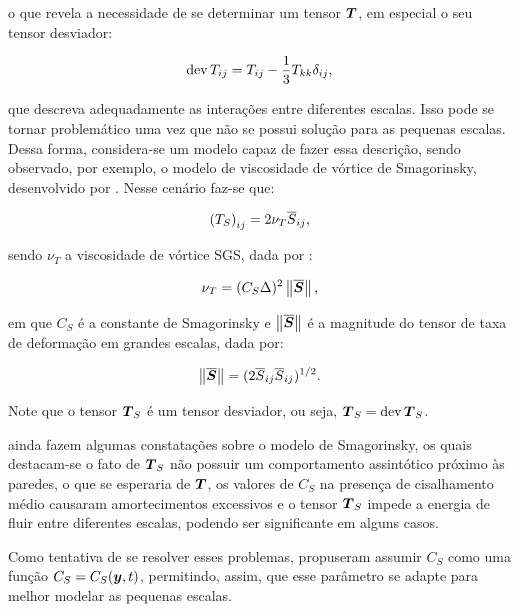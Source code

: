 \noindent o que revela a necessidade de se determinar um tensor $\boldsymbol{T}$, em especial o seu tensor desviador:

\begin{equation}
    \mathop{\mathrm{dev}}\nolimits{T_{ij}}=T_{ij}-\frac{1}{3}T_{kk}\delta_{ij}\text{,}
\end{equation}

\noindent que descreva adequadamente as interações entre diferentes escalas. Isso pode se tornar problemático uma vez que não se possui solução para as pequenas escalas. Dessa forma, considera-se um modelo capaz de fazer essa descrição, sendo observado, por exemplo, o modelo de viscosidade de vórtice de Smagorinsky, desenvolvido por . Nesse cenário faz-se que:

\begin{equation}
    \left({T_S}\right)_{ij}=2\nu_T\overline{S}_{ij}\text{,}
\end{equation}

\noindent sendo $\nu_T$ a viscosidade de vórtice SGS, dada por \cite{germano1991dynamic,piomelli1999large,hughes2000large,bailly2015turbulence,katopodes2019free}:

\begin{equation}
    \nu_T=(C_S\Delta)^2\left\lVert{\overline{\boldsymbol{S}}}\right\lVert\text{,}
\end{equation}

\noindent em que $C_S$ é a constante de Smagorinsky e $\left\lVert{\overline{\boldsymbol{S}}}\right\lVert$ é a magnitude do tensor de taxa de deformação em grandes escalas, dada por:

\begin{equation}
    \left\lVert{\overline{\boldsymbol{S}}}\right\lVert=(2\overline{S}_{ij}\overline{S}_{ij})^{1/2}\text{.}
\end{equation}

Note que o tensor $\boldsymbol{T}_S$ é um tensor desviador, ou seja, $\boldsymbol{T}_S=\mathop{\mathrm{dev}}\nolimits{\boldsymbol{T}_S}$.

 ainda fazem algumas constatações sobre o modelo de Smagorinsky, os quais destacam-se o fato de $\boldsymbol{T}_S$ não possuir um comportamento assintótico próximo às paredes, o que se esperaria de $\boldsymbol{T}$, os valores de $C_S$ na presença de cisalhamento médio causaram amortecimentos excessivos e o tensor $\boldsymbol{T}_S$ impede a energia de fluir entre diferentes escalas, podendo ser significante em alguns casos.

Como tentativa de se resolver esses problemas,  propuseram assumir $C_S$ como uma função $C_S=C_S(\boldsymbol{y},t)$, permitindo, assim, que esse parâmetro se adapte para melhor modelar as pequenas escalas.

